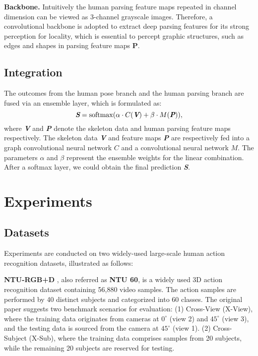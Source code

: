 \documentclass[runningheads]{llncs}
\begin{document}
\textbf{Backbone.} Intuitively the human parsing feature maps repeated in channel dimension can be viewed as 3-channel grayscale images. Therefore, a convolutional backbone is adopted to extract deep parsing features for its strong perception for locality, which is essential to percept graphic structures, such as edges and shapes in parsing feature maps $\bm{P}$.

\subsection{Integration}
\label{section:Integration}
The outcomes from the human pose branch and the human parsing branch are fused via an ensemble layer, which is formulated as:
\begin{equation}
\textit{$\textit{\textbf{S}}$} = \mathrm{softmax}(\alpha \cdot C(\textit{\textbf{V}}) + \beta \cdot M(\textit{\textbf{P}})),
\label{con:Equation4}
\end{equation}
where \textit{\textbf{V}} and \textit{\textbf{P}} denote the skeleton data and human parsing feature maps respectively. The skeleton data \textit{\textbf{V}} and feature maps \textit{\textbf{P}} are respectively fed into a graph convolutional neural network $C$ and a convolutional neural network $M$. The parameters $\alpha$ and $\beta$ represent the ensemble weights for the linear combination. After a softmax layer, we could obtain the final prediction \textit{\textbf{S}}.

\section{Experiments}
\subsection{Datasets}
Experiments are conducted on two widely-used large-scale human action recognition datasets, illustrated as follows:

\textbf{NTU-RGB+D} \cite{7780484}, also referred as \textbf{NTU 60}, is a widely used 3D action recognition dataset containing 56,880 video samples. The action samples are performed by 40 distinct subjects and categorized into 60 classes. The original paper \cite{7780484} suggests two benchmark scenarios for evaluation: (1) Cross-View (X-View), where the training data originates from cameras at $0^\circ$ (view 2) and $45^\circ$ (view 3), and the testing data is sourced from the camera at $45^\circ$ (view 1). (2) Cross-Subject (X-Sub), where the training data comprises samples from 20 subjects, while the remaining 20 subjects are reserved for testing.
\end{document}
